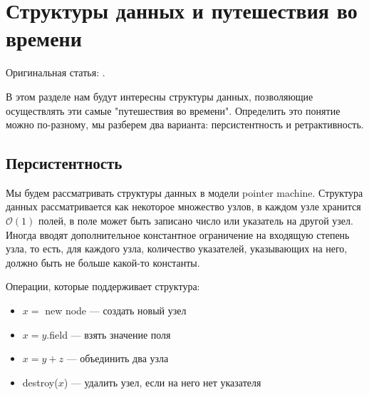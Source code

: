 \section{Структуры данных и путешествия во времени}

Оригинальная статья: \cite{demaine2007retroactive}.

В этом разделе нам будут интересны структуры данных, позволяющие осуществлять эти самые "путешествия во времени".
Определить это понятие можно по-разному, мы разберем два варианта: персистентность и ретрактивность.

\subsection{Персистентность}

Мы будем рассматривать структуры данных в модели pointer machine.
Структура данных рассматривается как некоторое множество узлов, в каждом узле хранится $\mathcal{O}(1)$ полей, в поле может быть записано число или указатель на другой узел.
Иногда вводят дополнительное константное ограничение на входящую степень узла, то есть, для каждого узла, количество указателей, указывающих на него, должно быть не больше какой-то константы.

\vspace{10pt}

\vspace{10pt}
Операции, которые поддерживает структура: 

\begin{itemize}

\item $x = $ new node --- создать новый узел
\item $x = y.$field --- взять значение поля
\item $x = y + z$ --- объединить два узла
\item destroy($x$) --- удалить узел, если на него нет указателя

\end{itemize}

